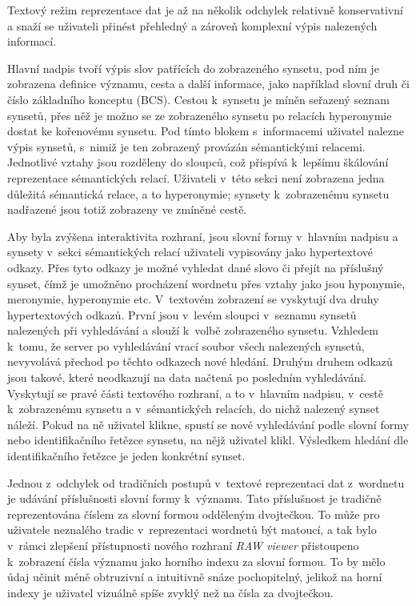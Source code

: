 \documentclass[a4paper, 11pt, oneside, showtrims]{book}
\newcommand{\simplywn}{\textit{RAW viewer} }
\begin{document}
				Textový režim reprezentace dat je až na několik odchylek relativně konservativní a snaží se uživateli přinést přehledný a zároveň komplexní výpis nalezených informací. 

				Hlavní nadpis tvoří výpis slov patřících do zobrazeného synsetu, pod ním je zobrazena definice významu, cesta a další informace, jako například slovní druh či číslo základního konceptu (BCS). Cestou k~synsetu je míněn seřazený seznam synsetů, přes něž je možno se ze zobrazeného synsetu po relacích hyperonymie dostat ke kořenovému synsetu. Pod tímto blokem s~informacemi uživatel nalezne výpis synsetů, s~nimiž je ten zobrazený provázán sémantickými relacemi. Jednotlivé vztahy jsou rozděleny do sloupců, což přispívá k~lepšímu škálování reprezentace sémantických relací. Uživateli v~této sekci není zobrazena jedna důležitá sémantická relace, a to hyperonymie; synsety k~zobrazenému synsetu nadřazené jsou totiž zobrazeny ve zmíněné cestě.

				Aby byla zvýšena interaktivita rozhraní, jsou slovní formy v~hlavním nadpisu a synsety v~sekci sémantických relací uživateli vypisovány jako hypertextové odkazy. Přes tyto odkazy je možné vyhledat dané slovo či přejít na příslušný synset, čímž je umožněno procházení wordnetu přes vztahy jako jsou hyponymie, meronymie, hyperonymie etc. V~textovém zobrazení se vyskytují dva druhy hypertextových odkazů. První jsou v~levém sloupci v~seznamu synsetů nalezených při vyhledávání a slouží k~volbě zobrazeného synsetu. Vzhledem k~tomu, že server po vyhledávání vrací soubor všech nalezených synsetů, nevyvolává přechod po těchto odkazech nové hledání. Druhým druhem odkazů jsou takové, které neodkazují na data načtená po posledním vyhledávání. Vyskytují se pravé části textového rozhraní, a to v~hlavním nadpisu, v~cestě k~zobrazenému synsetu a v~sémantických relacích, do nichž nalezený synset náleží. Pokud na ně uživatel klikne, spustí se nové vyhledávání podle slovní formy nebo identifikačního řetězce synsetu, na nějž uživatel klikl. Výsledkem hledání dle identifikačního řetězce je jeden konkrétní synset.

				Jednou z~odchylek od tradičních postupů v~textové reprezentaci dat z~wordnetu je udávání příslušnosti slovní formy k~významu. Tato příslušnost je tradičně reprezentována číslem za slovní formou odděleným dvojtečkou. To může pro uživatele neznalého tradic v~reprezentaci wordnetů být matoucí, a tak bylo v~rámci zlepšení přístupnosti nového rozhraní \simplywn přistoupeno k~zobrazení čísla významu jako horního indexu za slovní formou. To by mělo údaj učinit méně obtruzivní a intuitivně snáze pochopitelný, jelikož na horní indexy je uživatel  vizuálně spíše zvyklý než na čísla za dvojtečkou.
\end{document}
